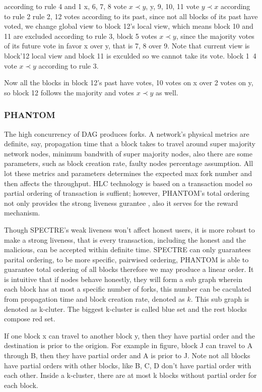 \documentclass[a4paper,11pt]{article}
\begin{document}
according to rule 4 and 1 x, 6, 7, 8 vote $x \prec y$, y, 9, 10, 11 vote $y \prec x$ according to rule 2 rule 2, 12 votes according to its past, since not all blocks of its past have voted, we change global view to block 12's local view, which means block 10 and 11 are excluded according to rule 3, block 5 votes $x \prec y$, since the majority votes of its future vote in favor x over y, that is 7, 8 over 9. Note that current view is block'12 local view and block 11 is exculded so we cannot take its vote. block 1~4 vote $x \prec y$ according to rule 3.

Now all the blocks in block 12's past have votes, 10 votes on x over 2 votes on y, so block 12 follows the majority and votes $x \prec y$ as well.


\subsubsection*{PHANTOM}
The high concurrency of DAG produces forks. A network's physical metrics are definite, say, propagation time that a block takes to travel around super majority network nodes, minimum bandwith of super majority nodes, also there are some parameters, such as block creation rate, faulty nodes percentage assumption. All lot these metrics and parameters determines the expected max fork number and then affects the throughput. HLC technology is based on a transaction model so partial ordering of transaction is suffient; however, PHANTOM's total ordering not only provides the strong liveness gurantee , also it serves for the reward mechanism.

Though SPECTRE's weak liveness won't affect honest users, it is more robust to make a strong liveness, that is every transaction, including the honest and the malicious, can be accepted within definite time. SPECTRE can only guarantees parital ordering, to be more specific, pairwised ordering, PHANTOM is able to guarantee total ordering of all blocks therefore we may produce a linear order. It is intuitive that if nodes behave honestly, they will form a sub graph wherein each block has at most a specific number of forks, this number can be caculated from propagation time and block creation rate, denoted as $k$. This sub graph is denoted as k-cluter. The biggest k-cluster is called blue set and the rest blocks compose red set.

If one block x can travel to another block y, then they have partial order and the destination is prior to the origion. For example in figure, block J can travel to A through B, then they have partial order and A is prior to J. Note not all blocks have partial orders with other blocks, like B, C, D don't have partial order with each other. Inside a k-cluster, there are at most k blocks without partial order for each block.
\end{document}
